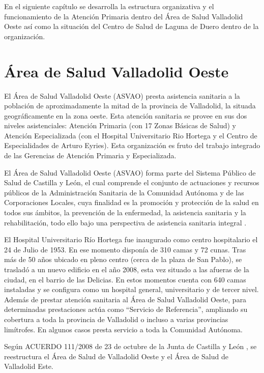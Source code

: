 En el siguiente capítulo se desarrolla la estructura organizativa y el funcionamiento de la Atención Primaria dentro del Área de Salud Valladolid Oeste así como la situación del Centro de Salud de Laguna de Duero dentro de la organización.

\section{Área de Salud Valladolid Oeste}

El Área de Salud Valladolid Oeste (ASVAO) presta asistencia sanitaria a la población de aproximadamente la mitad de la provincia de Valladolid, la situada geográficamente en la zona oeste.
Esta atención sanitaria se provee en sus dos niveles asistenciales: Atención Primaria (con 17 Zonas Básicas de Salud) y Atención Especializada (con el Hospital Universitario Rio Hortega y el Centro de Especialidades de Arturo Eyries).
Esta organización es fruto del trabajo integrado de las Gerencias de Atención Primaria y Especializada.

El Área de Salud Valladolid Oeste (ASVAO) forma parte del Sistema Público de Salud de Castilla y León, el cual comprende el conjunto de actuaciones y recursos públicos de la Administración Sanitaria de la Comunidad Autónoma y de las Corporaciones Locales, cuya finalidad es la promoción y protección de la salud en todos sus ámbitos, la prevención de la enfermedad, la asistencia sanitaria y la rehabilitación, todo ello bajo una perspectiva de asistencia sanitaria integral \cite{noauthor_ley_2010}.

El Hospital Universitario Río Hortega fue inaugurado como centro hospitalario el 24 de Julio de 1953.
En ese momento disponía de 310 camas y 72 cunas.
Tras más de 50 años ubicado en pleno centro (cerca de la plaza de San Pablo), se trasladó a un nuevo edificio en el año 2008, esta vez situado a las afueras de la ciudad, en el barrio de las Delicias.
En estos momentos cuenta con 640 camas instaladas y se configura como un hospital general, universitario y de tercer nivel.
Además de prestar atención sanitaria al Área de Salud Valladolid Oeste, para determinadas prestaciones actúa como “Servicio de Referencia”, ampliando su cobertura a toda la provincia de Valladolid o incluso a varias provincias limítrofes.
En algunos casos presta servicio a toda la Comunidad Autónoma.

Según ACUERDO 111/2008 de 23 de octubre de la Junta de Castilla y León \cite{noauthor_bocyl_2008}, se reestructura el Área de Salud de Valladolid Oeste y el Área de Salud de Valladolid Este.

